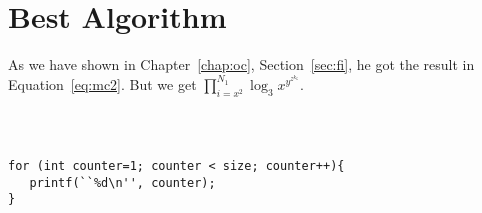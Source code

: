 \chapter{Best Algorithm}

As we have shown in Chapter~\ref{chap:oc}, Section~\ref{sec:fi}, he got the result in Equation~\ref{eq:mc2}. But we get $\prod_{i=x^2}^{N_1}\log_3 x^{y^{z^{k_6}}}$.

{\tt
\begin{verbatim}

for (int counter=1; counter < size; counter++){
   printf(``%d\n'', counter);
}

\end{verbatim}
}
